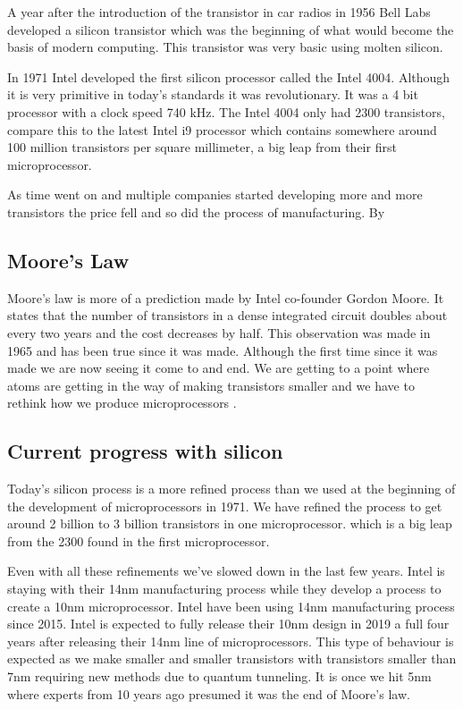 \documentclass[journal]{IEEEtran}
\begin{document}
A year after the introduction of the transistor in car radios in 1956 Bell Labs \cite{8896076320180101} developed a silicon transistor which was the beginning of what would become the basis of modern computing. This transistor was very basic using molten silicon.

In 1971 Intel developed the first silicon processor called the Intel 4004. Although it is very primitive in today's standards it was revolutionary. It was a 4 bit processor with a clock speed 740 kHz. The Intel 4004 only had 2300 transistors, compare this to the latest Intel i9 processor which contains somewhere around 100 million transistors per square millimeter, a big leap from their first microprocessor. 

As time went on and multiple companies started developing more and more transistors the price fell and so did the process of manufacturing. By 

\subsection{Moore's Law}
Moore's law \cite{12560013020170101} is more of a prediction made by Intel co-founder Gordon Moore. It states that the number of transistors in a dense integrated circuit doubles about every two years and the cost decreases by half. This observation was made in 1965 and has been true since it was made. Although the first time since it was made we are now seeing it come to and end. We are getting to a point where atoms are getting in the way of making transistors smaller and we have to rethink how we produce microprocessors \cite{591665}.

\subsection{Current progress with silicon}
Today's silicon process is a more refined process than we used at the beginning of the development of microprocessors in 1971. We have refined the process to get around 2 billion to 3 billion transistors in one microprocessor. which is a big leap from the 2300 found in the first microprocessor.

Even with all these refinements we've slowed down in the last few years. Intel is staying with their 14nm manufacturing process while they develop a process to create a 10nm microprocessor. Intel have been using 14nm manufacturing process since 2015. Intel is expected to fully release their 10nm design in 2019 a full four years after releasing their 14nm line of microprocessors. This type of behaviour is expected as we make smaller and smaller transistors with transistors smaller than 7nm requiring new methods due to quantum tunneling. It is once we hit 5nm where experts from 10 years ago presumed it was the end of Moore's law. \cite{591665}
\end{document}
